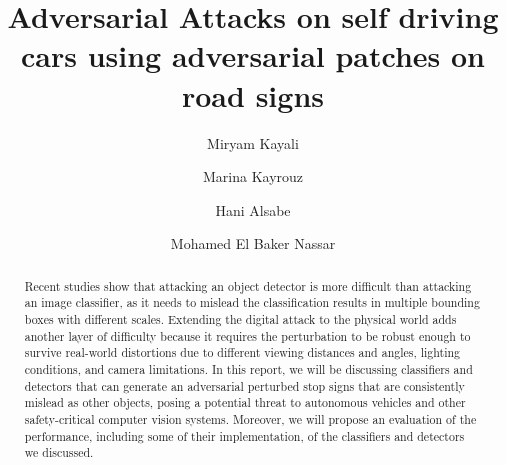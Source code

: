 \documentclass[sigconf, nonacm]{acmart}
\begin{document}
\title{Adversarial Attacks on self driving cars using adversarial patches on road signs}



\author{Miryam Kayali}

\author{Marina Kayrouz}


\author{Hani Alsabe}


\author{Mohamed El Baker Nassar}


\begin{abstract}
Recent studies show that attacking an object detector is more difficult than attacking an image classifier, as it needs to mislead the classification results in multiple bounding boxes with different scales. Extending the digital attack to the physical world adds another layer of difficulty because it requires the perturbation to be robust enough to survive real-world distortions due to different viewing distances and angles, lighting conditions, and camera limitations. In this report, we will be discussing classifiers and detectors that can generate an adversarial perturbed stop signs that are consistently mislead as other objects, posing a potential threat to autonomous vehicles and other safety-critical computer vision systems. Moreover, we will propose an evaluation of the performance, including some of their implementation, of the classifiers and detectors we discussed.

\end{abstract}

\maketitle
\end{document}
